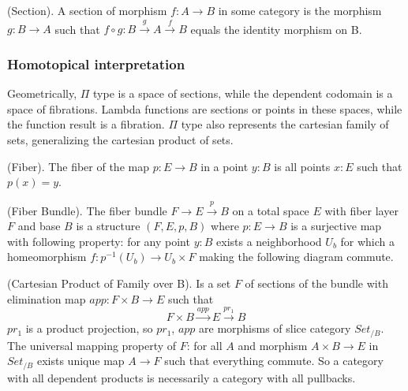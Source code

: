 \documentclass{article}
\begin{document}
\begin{definition} (Section).
A section of morphism $f: A \rightarrow B$ in some category is the morphism $g: B \rightarrow A$
such that $f \circ g: B \xrightarrow{g} A \xrightarrow{f} B$ equals the identity morphism on B.
\end{definition}

\subsubsection*{Homotopical interpretation}

Geometrically, $\Pi$ type is a space of sections, while the dependent codomain is a space of fibrations.
Lambda functions are sections or points in these spaces, while the function result is a fibration.
$\Pi$ type also represents the cartesian family of sets, generalizing the cartesian product of sets.

\begin{definition} (Fiber).
The fiber of the map $p: E \rightarrow B$ in a point $y: B$ is all points $x: E$ such that $p(x)=y$.
\end{definition}

\begin{definition} (Fiber Bundle).
The fiber bundle $ F \rightarrow E \xrightarrow{p} B$ on a total space $E$ with fiber layer $F$ and base $B$ is a
structure $(F,E,p,B)$ where $p: E \rightarrow B$ is a surjective map with following property:
for any point $y: B$ exists a neighborhood $U_b$ for which a homeomorphism $f: p^{-1}(U_b) \rightarrow U_b \times F$
making the following diagram commute.
\begin{center}
\end{center}
\end{definition}

\begin{definition} (Cartesian Product of Family over B).
Is a set $F$ of sections of the bundle with elimination map $app : F \times B \rightarrow E$ such that
\begin{equation}
F \times B \xrightarrow{app} E \xrightarrow{pr_1} B
\end{equation}
$pr_1$ is a product projection, so $pr_1$, $app$ are morphisms
of slice category $Set_{/B}$. The universal mapping property of $F$:
for all $A$ and morphism $A \times B \rightarrow E$ in $Set_{/B}$ exists
unique map $A \rightarrow F$ such that everything commute. So a category
with all dependent products is necessarily a category with all pullbacks.
\end{definition}
\end{document}
